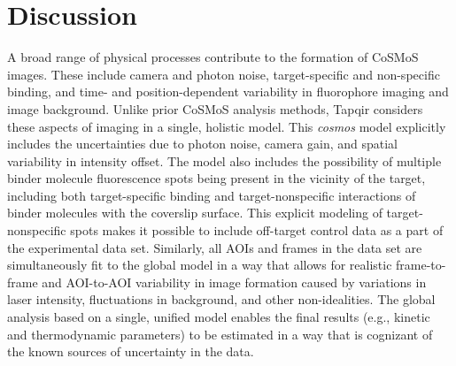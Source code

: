 \section{Discussion}

A broad range of physical processes contribute to the formation of CoSMoS images. These include camera and photon noise, target-specific and non-specific binding, and time- and position-dependent variability in fluorophore imaging and image background. Unlike prior CoSMoS analysis methods, Tapqir considers these aspects of imaging in a single, holistic model. This \emph{cosmos} model explicitly includes the uncertainties due to photon noise, camera gain, and spatial variability in intensity offset. The model also includes the possibility of multiple binder molecule fluorescence spots being present in the vicinity of the target, including both target-specific binding and target-nonspecific interactions of binder molecules with the coverslip surface. This explicit modeling of target-nonspecific spots makes it possible to include off-target control data as a part of the experimental data set.  Similarly, all AOIs and frames in the data set are simultaneously fit to the global model in a way that allows for realistic frame-to-frame and AOI-to-AOI variability in image formation caused by variations in laser intensity, fluctuations in background, and other non-idealities. The global analysis based on a single, unified model enables the final results (e.g., kinetic and thermodynamic parameters) to be estimated in a way that is cognizant of the known sources of uncertainty in the data.

